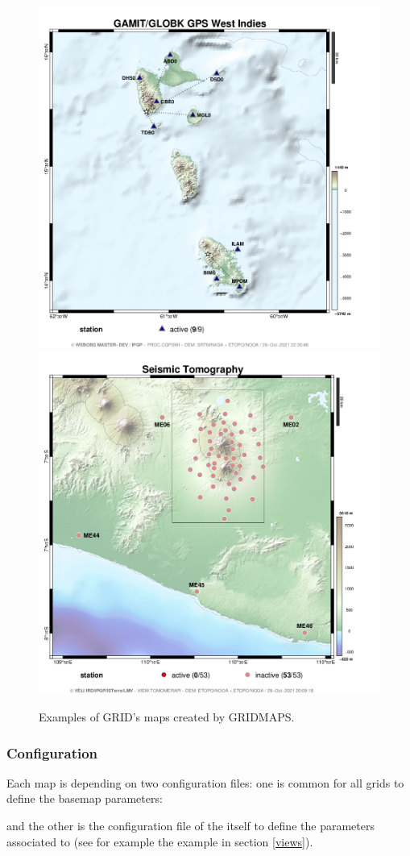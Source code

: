 \begin{figure}
\includegraphics[height=.6\textwidth]{figures/PROC_CGPSWI_map.png}
\includegraphics[height=.6\textwidth]{figures/VIEW_TOMOMERAPI_map.png}
\caption{Examples of GRID's maps created by GRIDMAPS.}
\end{figure}

\subsubsection{Configuration}

Each  map is depending on two configuration files: one is common for all grids to define the basemap parameters:



and the other is the configuration file of the  itself to define the parameters associated to  (see for example the  example in section \ref{views}).

